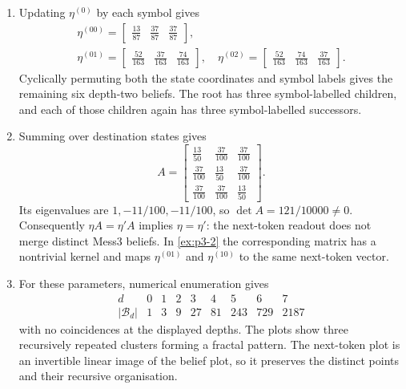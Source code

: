 \documentclass[11pt]{article}
\begin{document}
\begin{solution}[ex:p3-3]
\begin{enumerate}
\begin{enumerate}
          \item Updating $\eta^{(0)}$ by each symbol gives
            \[
              \begin{gathered}
              \eta^{(00)}=
                \begin{bmatrix}\tfrac{13}{87}&\tfrac{37}{87}&\tfrac{37}{87}\end{bmatrix},\\[1mm]
              \eta^{(01)}=
                \begin{bmatrix}\tfrac{52}{163}&\tfrac{37}{163}&\tfrac{74}{163}\end{bmatrix},
              \quad
              \eta^{(02)}=
                \begin{bmatrix}\tfrac{52}{163}&\tfrac{74}{163}&\tfrac{37}{163}\end{bmatrix}.
              \end{gathered}
            \]
            Cyclically permuting both the state coordinates and symbol labels
            gives the remaining six depth-two beliefs. The root has three
            symbol-labelled children, and each of those children again has
            three symbol-labelled successors.

          \item Summing over destination states gives
            \[
              A=\begin{bmatrix}
                \tfrac{13}{50}&\tfrac{37}{100}&\tfrac{37}{100}\\
                \tfrac{37}{100}&\tfrac{13}{50}&\tfrac{37}{100}\\
                \tfrac{37}{100}&\tfrac{37}{100}&\tfrac{13}{50}
              \end{bmatrix}.
            \]
            Its eigenvalues are $1,-11/100,-11/100$, so
            $\det A=121/10000\neq0$. Consequently
            $\eta A=\eta' A$ implies $\eta=\eta'$: the next-token readout
            does not merge distinct Mess3 beliefs. In \cref{ex:p3-2} the
            corresponding matrix has a nontrivial kernel and maps
            $\eta^{(01)}$ and $\eta^{(10)}$ to the same next-token vector.

          \item For these parameters, numerical enumeration gives
            \[
              \begin{array}{c|rrrrrrrr}
                d&0&1&2&3&4&5&6&7\\ \hline
                |\mathcal B_d|&1&3&9&27&81&243&729&2187
              \end{array}
            \]
            with no coincidences at the displayed depths. The plots show
            three recursively repeated clusters forming a fractal pattern.
            The next-token plot is an invertible linear image of the belief
            plot, so it preserves the distinct points and their recursive
            organisation.


\end{enumerate}
\end{enumerate}
\end{solution}
\end{document}
